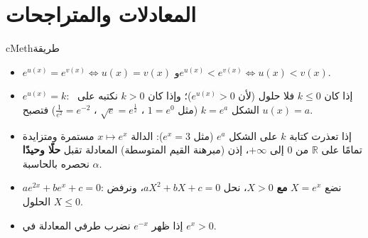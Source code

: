 \documentclass[12pt,a4paper]{article}
\newenvironment{BOX}[2]{\begin{otherlanguage}{english}\begin{arbox}{#1}{#2}}{\end{arbox}\end{otherlanguage}}
\newenvironment{tariqa}[1][طريقة]{\begin{BOX}{cMeth}{#1}}{\end{BOX}}
\newcommand{\R}{\mathbb{R}}
\begin{document}
\section{المعادلات والمتراجحات}
\begin{tariqa}
\begin{itemize}
\item $e^{u(x)}=e^{v(x)}\iff u(x)=v(x)$ \quad و\quad $e^{u(x)}<e^{v(x)}\iff u(x)<v(x)$.
\item $e^{u(x)}=k$: \ إذا كان $k\leqslant0$ فلا حلول (لأن $e^{u(x)}>0$)؛ وإذا كان $k>0$ نكتبه على الشكل $k=e^{a}$ (مثل $1=e^{0}$ ، $\sqrt{e}=e^{\frac{1}{2}}$ ، $\frac{1}{e^{2}}=e^{-2}$) فتصبح $u(x)=a$.
\item إذا تعذرت كتابة $k$ على الشكل $e^{a}$ (مثل $e^{x}=3$): الدالة $x\mapsto e^{x}$ مستمرة ومتزايدة تمامًا على $\R$ من $0$ إلى $+\infty$، إذن (مبرهنة القيم المتوسطة) المعادلة تقبل \textbf{حلًا وحيدًا} $\alpha$ نحصره بالحاسبة.
\item $ae^{2x}+be^{x}+c=0$: نضع $X=e^{x}$ \textbf{مع} $X>0$، نحل $aX^{2}+bX+c=0$، ونرفض الحلول $X\leqslant0$.
\item إذا ظهر $e^{-x}$ نضرب طرفي المعادلة في $e^{x}>0$.
\end{itemize}
\end{tariqa}
\end{document}
